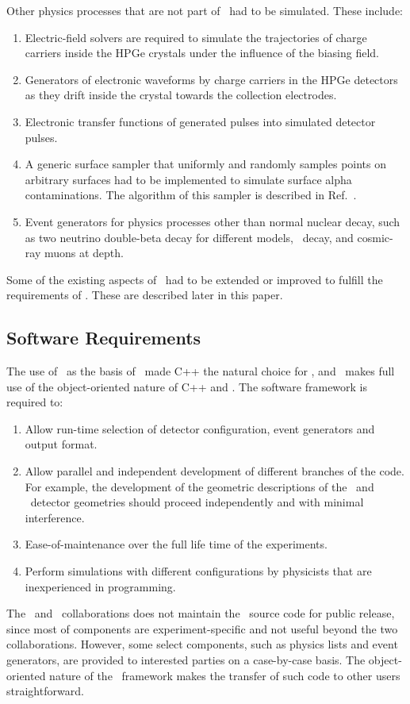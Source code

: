 \documentclass[article]{IEEEtran}
\begin{document}
Other physics processes that are not part of \GF\ had to be simulated. These include:
\begin{enumerate}
\item Electric-field solvers are required to simulate the trajectories of charge carriers inside the HPGe crystals under the influence of the biasing field.
\item Generators of electronic waveforms by charge carriers in the HPGe detectors as they drift inside the crystal towards the collection electrodes. %
\item Electronic transfer functions of generated pulses into simulated detector pulses. 
\item A generic surface sampler that uniformly and randomly samples points on arbitrary surfaces had to be implemented to simulate surface alpha contaminations. The algorithm of this sampler is described in Ref.~\cite{surfacesampler}.
\item Event generators for physics processes other than normal nuclear decay, such as two neutrino double-beta decay for different models, \nubb\ decay, and cosmic-ray muons at depth.  
\end{enumerate}
Some of the existing aspects of \GF\ had to be extended or improved to fulfill the requirements of \MaGe . These are described later in this paper.

\subsection{Software Requirements}
\label{se:software_requirement}

The use of \GF\ as the basis of \MaGe\ made C++ the natural choice for \MaGe , and \MaGe\ makes full use of the object-oriented nature of C++ and \GF{}. The software framework is required to:
\begin{enumerate}
\item Allow run-time selection of detector configuration, event generators and output format. 
\item Allow parallel and independent
development of different branches of the code. For example, the development of the geometric descriptions of the \Gerda\ and \MJ\ detector geometries should proceed independently and with minimal interference. 
\item Ease-of-maintenance over the full life time of the
experiments.
\item Perform simulations with different
configurations by physicists that are inexperienced in programming.   
\end{enumerate}
The \MJ\ and \Gerda\ collaborations does not maintain the \MaGe\ source code for public 
release, since most of components are experiment-specific and not useful beyond the two collaborations. However, some select components, such as physics lists and event generators, are provided to 
interested parties on a case-by-case basis. The object-oriented nature of the \MaGe\ framework makes the transfer of 
such code to other users straightforward. 
\end{document}
